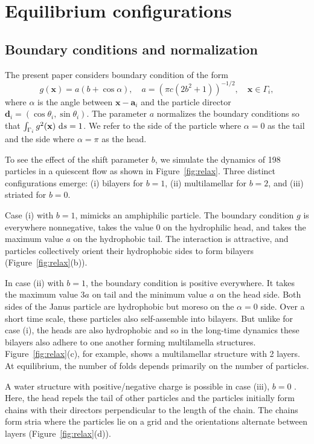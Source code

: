 \documentclass[aps,prl,preprint,groupedaddress]{revtex4-2}
\renewcommand{\aa}{\mathbf{a}}
\newcommand{\dd}{\mathbf{d}}
\newcommand{\xx}{\mathbf{x}}
\begin{document}
\section{Equilibrium configurations}
\subsection{Boundary conditions and normalization}
The present paper considers boundary condition of the form
\begin{equation}
  \label{eq:bc-type}
g(\xx) = a(b + \cos \alpha),\quad a = (\pi c(2b^2 + 1))^{-1/2},\quad \xx \in \Gamma_i,
\end{equation}
where $\alpha$ is the angle between $\xx - \aa_i$ and the particle director
$\dd_i = (\cos \theta_i, \sin \theta_i)$.
The parameter $a$ normalizes the boundary conditions 
so that $\int_{\Gamma_i} g^2(\xx) \, \dif s = 1$.
We refer to the side of the particle where $\alpha = 0$
as the tail and the side where $\alpha = \pi$ as the head. 


To see the effect of the shift parameter $b$, we simulate the dynamics of
198 particles in a quiescent flow as shown in Figure~\ref{fig:relax}.
Three distinct configurations emerge:
(i) bilayers for $b = 1$, 
(ii) multilamellar for $b = 2$, and 
(iii) striated for $b = 0$.

Case (i) with $b = 1$, mimicks an amphiphilic particle.
The boundary condition $g$ is everywhere nonnegative,
takes the value $0$ on the
hydrophilic head,
and takes the maximum value $a$ on the
hydrophobic tail. 
The interaction is attractive, and particles collectively orient their
hydrophobic sides to form bilayers  (Figure~\ref{fig:relax}(b)). 

In case (ii) with $b = 1$, the boundary condition is positive everywhere.
It takes the maximum value $3a$ on tail and the
minimum value $a$ on the head side. 
Both sides of the Janus particle are hydrophobic but
moreso on the $\alpha = 0$ side.  
Over a short time scale, these particles also self-assemble into bilayers. But unlike for case (i),
the heads are also hydrophobic and so in the long-time dynamics
these bilayers also adhere to one another 
forming multilamella structures. Figure~\ref{fig:relax}(c), for example, shows a
multilamellar structure with 2 layers.
At equilibrium, the number of folds depends primarily on the number of particles.

A water structure with
positive/negative charge is possible in case (iii), $b = 0$
\cite{MaRa76, Ma77}.
Here, the head repels the tail of other particles
and the particles initially form chains with their directors perpendicular
to the length of the chain.  
The chains form stria
where the particles lie on a 
grid and the orientations alternate between layers (Figure~\ref{fig:relax}(d)).
\end{document}
